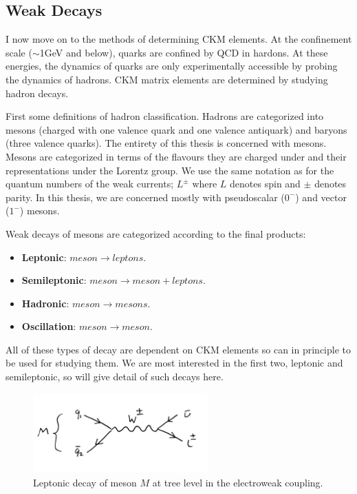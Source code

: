 \subsection{Weak Decays}
\label{sec:weakdecays}

I now move on to the methods of determining CKM elements. At the confinement scale ($\sim$1GeV and below), quarks are confined by QCD in hardons. At these energies, the dynamics of quarks are only experimentally accessible by probing the dynamics of hadrons. CKM matrix elements are determined by studying hadron decays.

First some definitions of hadron classification. Hadrons are categorized into mesons (charged with one valence quark and one valence antiquark) and baryons (three valence quarks). The entirety of this thesis is concerned with mesons. Mesons are categorized in terms of the flavours they are charged under and their representations under the Lorentz group. We use the same notation as for the quantum numbers of the weak currents; $L^{\pm}$ where $L$ denotes spin and $\pm$ denotes parity. In this thesis, we are concerned mostly with pseudoscalar ($0^-$) and vector ($1^-$) mesons.

Weak decays of mesons are categorized according to the final products:
\begin{itemize}
\item
  {\bf{Leptonic}}: $meson \to leptons$.
\item
  {\bf{Semileptonic}}: $meson \to meson + leptons$.
\item
  {\bf{Hadronic}}: $meson \to mesons$.
\item
  {\bf{Oscillation}}: $meson \to meson$.
\end{itemize}

All of these types of decay are dependent on CKM elements so can in principle to be used for studying them. We are most interested in the first two, leptonic and semileptonic, so will give detail of such decays here.

\begin{figure}
  \vspace{-10pt}
  \begin{center}
    \includegraphics[width=0.6\textwidth]{images/leptonicdecay.jpg}
  \end{center}
  \vspace{-20pt}
  \caption{Leptonic decay of meson $M$ at tree level in the electroweak coupling.}
  \label{fig:leptonicdecay}
\end{figure}

